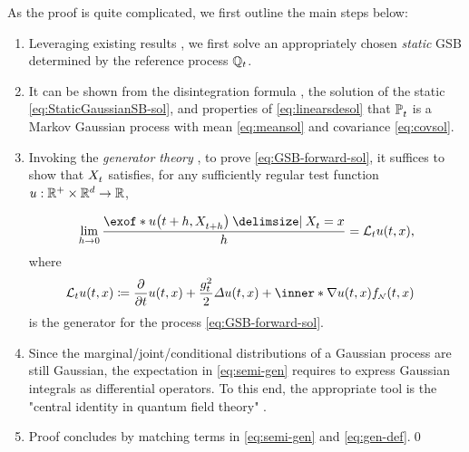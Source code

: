 As the proof is quite complicated, we first outline the main steps below:
\begin{enumerate}[leftmargin=.5cm,itemsep=.01cm,topsep=0cm]
\item Leveraging existing results \citep{bojilov2016matching, del2020statistical, janati2020entropic,mallasto2021entropy}, we first solve an appropriately chosen \emph{static} \acrshort{GSB} determined by the reference process $\mathbb{Q}_{ t }$.
\item It can be shown from the disintegration formula \citep{leonard2013survey}, the solution of the static  \eqref{eq:StaticGaussianSB-sol}, and properties of \eqref{eq:linearsdesol} that $\mathbb{P}^{}_{ t }$ is a Markov Gaussian process with mean \eqref{eq:meansol} and covariance \eqref{eq:covsol}.

\item Invoking the \emph{generator theory} \citep{protter2005stochastic}, to prove \eqref{eq:GSB-forward-sol}, it suffices to show that $X^{}_{ t }$ satisfies, for any sufficiently regular test function $u : \mathbb{R}^+ \times \mathbb{R}^d \rightarrow \mathbb{R}$,

\begin{align}
\label{eq:semi-gen}
\lim_{h\to 0} \frac{ \exof*{ \testf[\ctime+h][\Xsol[\ctime+h]] \given \Xsol = \point } }{h}
    = \generator \testf,
\end{align}
where 
\begin{align}
\label{eq:gen-def}
\generator \testf  &\defeq \frac{\del}{\del \ctime} \testf + \frac{ \volatsq[\ctime] }{2} \Laplace\testf  + \inner*{\nabla \testf}{ \GSBf } 
\end{align}
is the generator for the process \eqref{eq:GSB-forward-sol}.

\item Since the marginal/joint/conditional distributions of a Gaussian process are still Gaussian, the expectation in \eqref{eq:semi-gen} requires to express Gaussian integrals as differential operators. To this end, the appropriate tool is the "central identity in quantum field theory" \citep{zee2010quantum}.%

\item Proof concludes by matching terms in \eqref{eq:semi-gen} and \eqref{eq:gen-def}.\qed
\end{enumerate}

